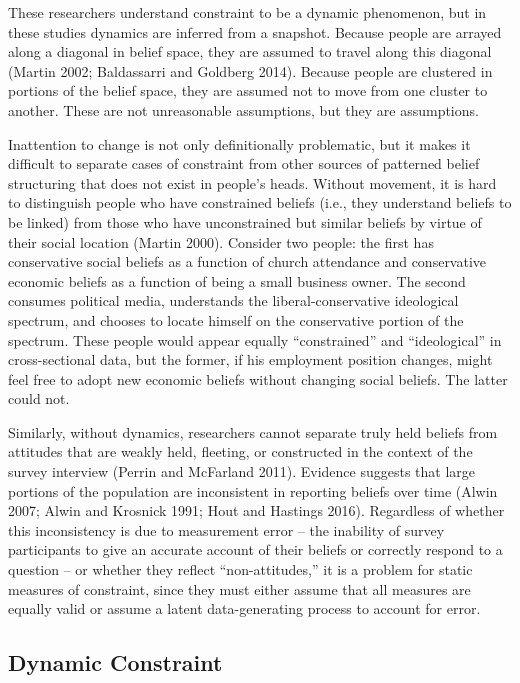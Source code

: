 \documentclass[12pt,]{article}
\begin{document}
These researchers understand constraint to be a dynamic phenomenon, but in these studies dynamics are inferred from a snapshot. Because people are arrayed along a diagonal in belief space, they are assumed to travel along this diagonal (Martin 2002; Baldassarri and Goldberg 2014). Because people are clustered in portions of the belief space, they are assumed not to move from one cluster to another. These are not unreasonable assumptions, but they are assumptions.

Inattention to change is not only definitionally problematic, but it makes it difficult to separate cases of constraint from other sources of patterned belief structuring that does not exist in people's heads. Without movement, it is hard to distinguish people who have constrained beliefs (i.e., they understand beliefs to be linked) from those who have unconstrained but similar beliefs by virtue of their social location (Martin 2000). Consider two people: the first has conservative social beliefs as a function of church attendance and conservative economic beliefs as a function of being a small business owner. The second consumes political media, understands the liberal-conservative ideological spectrum, and chooses to locate himself on the conservative portion of the spectrum. These people would appear equally ``constrained'' and ``ideological'' in cross-sectional data, but the former, if his employment position changes, might feel free to adopt new economic beliefs without changing social beliefs. The latter could not.

Similarly, without dynamics, researchers cannot separate truly held beliefs from attitudes that are weakly held, fleeting, or constructed in the context of the survey interview (Perrin and McFarland 2011). Evidence suggests that large portions of the population are inconsistent in reporting beliefs over time (Alwin 2007; Alwin and Krosnick 1991; Hout and Hastings 2016). Regardless of whether this inconsistency is due to measurement error -- the inability of survey participants to give an accurate account of their beliefs or correctly respond to a question -- or whether they reflect ``non-attitudes,'' it is a problem for static measures of constraint, since they must either assume that all measures are equally valid or assume a latent data-generating process to account for error.

\hypertarget{dynamic-constraint}{%
\subsection{Dynamic Constraint}\label{dynamic-constraint}}
\end{document}
